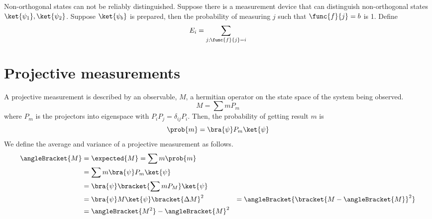 \begin{remark}
    Non-orthogonal states can not be reliably distinguished. Suppose there is a measurement device that can distinguish non-orthogonal states \(\ket{\psi_1}, \ket{\psi_2}\). Suppose \(\ket{\psi_b}\) is prepared, then the probability of measuring \(j\) such that \(\func{f}{j} = b\) is 1. Define 
    \begin{equation*}
        E_i = \sum_{j; \func{f}{j} = i} 
    \end{equation*}
\end{remark}
\section{Projective measurements}
A projective measurement is described by an observable, \(M\), a hermitian operator on the state space of the system being observed.
\begin{equation*}
    M = \sum m P_m
\end{equation*}
where \(P_m\) is the projectors into eigenspace with \(P_i P_j = \delta_{ij} P_i\). Then, the probability of getting result \(m\) is 
\begin{equation*}
    \prob{m} = \bra{\psi} P_m \ket{\psi}
\end{equation*}
We define the average and variance of a projective measurement as follows.
\begin{align*}
    \angleBracket{M} &= \expected{M} = \sum m \prob{m} \\
    &= \sum m \bra{\psi} P_m \ket{\psi} \\
    &= \bra{\psi} \bracket{\sum m P_M} \ket{\psi}\\
    &= \bra{\psi} M \ket{\psi}
    \bracket{\Delta M}^2 &= \angleBracket{\bracket{M - \angleBracket{M}}^2}\\
    &= \angleBracket{M^2} - \angleBracket{M}^2
\end{align*}

